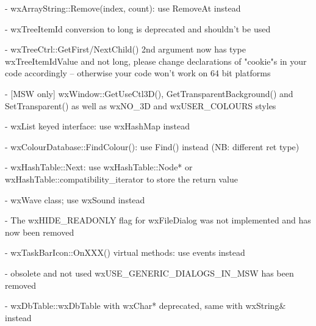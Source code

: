 - wxArrayString::Remove(index, count): use RemoveAt instead

- wxTreeItemId conversion to long is deprecated and shouldn't be used

- wxTreeCtrl::GetFirst/NextChild() 2nd argument now has type wxTreeItemIdValue
  and not long, please change declarations of "cookie"s in your code
  accordingly -- otherwise your code won't work on 64 bit platforms

- [MSW only] wxWindow::GetUseCtl3D(), GetTransparentBackground() and
             SetTransparent() as well as wxNO\_3D and wxUSER\_COLOURS styles

- wxList keyed interface: use wxHashMap instead

- wxColourDatabase::FindColour(): use Find() instead (NB: different ret type)

- wxHashTable::Next: use wxHashTable::Node* or
                     wxHashTable::compatibility\_iterator to store the return
                     value

- wxWave class; use wxSound instead

- The wxHIDE\_READONLY flag for wxFileDialog was not implemented
  and has now been removed

- wxTaskBarIcon::OnXXX() virtual methods: use events instead

- obsolete and not used wxUSE\_GENERIC\_DIALOGS\_IN\_MSW has been removed

- wxDbTable::wxDbTable with wxChar* deprecated, same with wxString& instead
